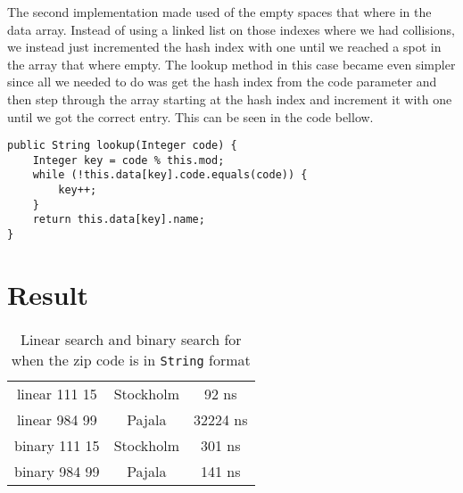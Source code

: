 \documentclass[a4paper,11pt]{article}
\begin{document}
The second implementation made used of the empty spaces that where in the data array. Instead of using a linked list on those indexes where we had collisions, we instead just
incremented the hash index with one until we reached a spot in the array that where empty. The lookup method in this case became even simpler since all we needed to do was get
the hash index from the code parameter and then step through the array starting at the hash index and increment it with one until we got the correct entry. This can be seen in
the code bellow.
\begin{verbatim}
public String lookup(Integer code) {
    Integer key = code % this.mod;
    while (!this.data[key].code.equals(code)) {
        key++;
    }
    return this.data[key].name;
}
\end{verbatim}

\section{Result}

\begin{table}[h!]
    \begin{center}
        \caption{Linear search and binary search for when the zip code is in {\tt String} format}
        \label{tab:StringZip}
        \begin{tabular}{|c|c|c|}
            \hline
            linear 111 15 & Stockholm & 92 ns    \\
            linear 984 99 & Pajala    & 32224 ns \\
            binary 111 15 & Stockholm & 301 ns   \\
            binary 984 99 & Pajala    & 141 ns   \\
            \hline
        \end{tabular}
    \end{center}
\end{table}
\end{document}
